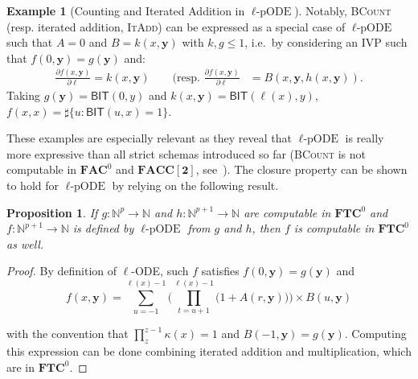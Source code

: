 \documentclass[11pt, oneside]{article}
\newcommand{\BIT}{\mathsf{BIT}}
\newcommand{\fun}[1]{\mathsf{#1}}
\newcommand{\sB}{B}
\newcommand{\sA}{A}
\newcommand{\Nat}{\mathbb{N}}
\newcommand{\AC}{\mathbf{FAC}}
\newcommand{\TC}{\mathbf{FTC}}
\newcommand{\FACC}{\mathbf{FACC[2]}}
\newcommand{\tu}[1]{\mathbf{#1}}
\newtheorem{prop}{Proposition}
\theoremstyle{definition}
\newtheorem{example}{Example}
\newcommand{\pODE}{\ell\text{-pODE}}
\begin{document}
\begin{example}[Counting and Iterated Addition in $\pODE$]\label{ex:pODE}
    Notably, \textsc{BCount} (resp. iterated addition, \textsc{ItAdd}) can be expressed as a special case of $\pODE$ such that $A=0$ and $B=k(x, \tu y)$ with $k,g\leq 1$, i.e.~by considering an IVP such that $f(0, \tu y) = g(\tu y)$ and:
    \begin{align*}
        \frac{\partial f(x, \tu y)}{\partial \ell} = k(x, \tu y) \qquad (\mbox{resp. }  \frac{\partial f(x, \tu y)}{\partial \ell} &= \sB(x, \tu y, h(x, \tu y)).
    \end{align*}
    Taking $g(\tu y)=\fun{BIT}(0, y)$ and $k(x, \tu y)=\BIT(\ell(x),y)$, $f(x,x)=\sharp \{u: \BIT(u,x)=1\}$. 
\end{example}


\noindent
These examples are especially relevant as they reveal that $\pODE$ is really more expressive than all strict schemas introduced so far (\textsc{BCount} is not computable in $\AC^0$ and $\FACC$, see~\cite{Razborov87,DBLP:conf/stoc/Smolensky87}).
The closure property can be shown to hold for $\pODE$ by relying on the following result.

\begin{prop}\label{prop:pODE}
 If $g: \Nat^p \to \Nat$ and $h:\Nat^{p+1} \to \Nat$ are computable in $\TC^0$ and $f:\Nat^{p+1}\to \Nat$ is defined by $\pODE$ from $g$ and $h$, then $f$ is computable in $\TC^0$ as well.
\end{prop}

\begin{proof} By definition of $\ell$-ODE, such $f$ satisfies
$f(0, \tu y)=g(\tu y)$ and
 $$
        f(x, \tu y) = \sum^{\ell(x)-1}_{u=-1} \Bigg(\prod^{\ell(x)-1}_{t=u+1} \bigg(1+\sA(r, \tu y)\bigg)\Bigg) \times \sB (u, \tu y)
    $$
   
\noindent with the convention that $\prod^{z-1}_z \kappa(x)=1$ and $\sB(-1, \tu y)=g(\tu y)$. Computing this expression can be done combining iterated addition and multiplication, which are in $\TC^0$.  
\end{proof}
\end{document}
